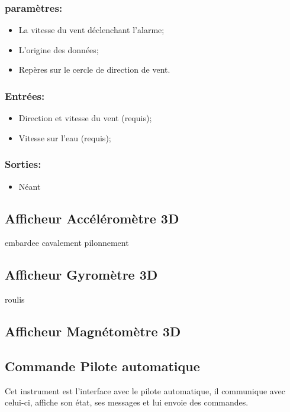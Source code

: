 \documentclass[a4paper,11pt]{report}
\begin{document}
\subsubsection{paramètres:}
\begin{itemize}
	\item La vitesse du vent déclenchant l'alarme;
	\item L'origine des données;
	\item Repères sur le cercle de direction de vent.
\end{itemize}

\subsubsection{Entrées:}
\begin{itemize}
	\item Direction et vitesse du vent (requis);
	\item Vitesse sur l'eau (requis);
\end{itemize}

\subsubsection{Sorties:}
\begin{itemize}
	\item Néant
\end{itemize}

\subsection{Afficheur Accéléromètre 3D}
\gls{embardee}
\gls{cavalement}
\gls{pilonnement}
\subsection{Afficheur Gyromètre 3D}
\gls{roulis}

\subsection{Afficheur Magnétomètre 3D}

\subsection{Commande Pilote automatique}
Cet instrument est l'interface avec le pilote automatique, il communique avec celui-ci,
affiche son état, ses messages et lui envoie des commandes.

\end{document}
